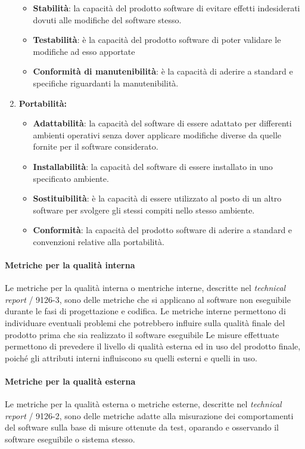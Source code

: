 \begin{enumerate}
\begin{itemize}
      \item \textbf{Stabilità}: la capacità del prodotto software di evitare effetti indesiderati dovuti alle modifiche del software stesso.
      \item \textbf{Testabilità}: è la capacità del prodotto software di poter validare le modifiche ad esso apportate
      \item \textbf{Conformità di manutenibilità}: è la capacità di aderire a standard e specifiche riguardanti la manutenibilità.
    \end{itemize}
    \item \textbf{Portabilità:}
    \begin{itemize}
      \item \textbf{Adattabilità}: la capacità del software di essere adattato per differenti ambienti operativi senza dover applicare modifiche diverse da quelle fornite per il software considerato.
      \item \textbf{Installabilità}: la capacità del software di essere installato in uno specificato ambiente.
      \item \textbf{Sostituibilità}: è la capacità di essere utilizzato al posto di un altro software per svolgere gli stessi compiti nello stesso ambiente.
      \item \textbf{Conformità}: la capacità del prodotto software di aderire a standard e convenzioni relative alla portabilità.
    \end{itemize}
  \end{enumerate}

  \paragraph{Metriche per la qualità interna}
    Le metriche per la qualità interna o mentriche interne, descritte nel \emph{technical report} / 9126-3,
    sono delle metriche che si applicano al software non eseguibile durante le fasi di progettazione e codifica.
    Le metriche interne permettono di individuare eventuali problemi che potrebbero influire sulla qualità finale del prodotto prima che sia realizzato il software eseguibile
    Le misure effettuate permettono di prevedere il livello di qualità esterna ed in uso del prodotto finale,
    poiché gli attributi interni influiscono su quelli esterni e quelli in uso.

  \paragraph{Metriche per la qualità esterna}
    Le metriche per la qualità esterna o metriche esterne, descritte nel \emph{technical report} / 9126-2,
    sono delle metriche adatte alla misurazione dei comportamenti del software sulla base di misure ottenute da test, oparando e osservando il software eseguibile o sistema stesso.

